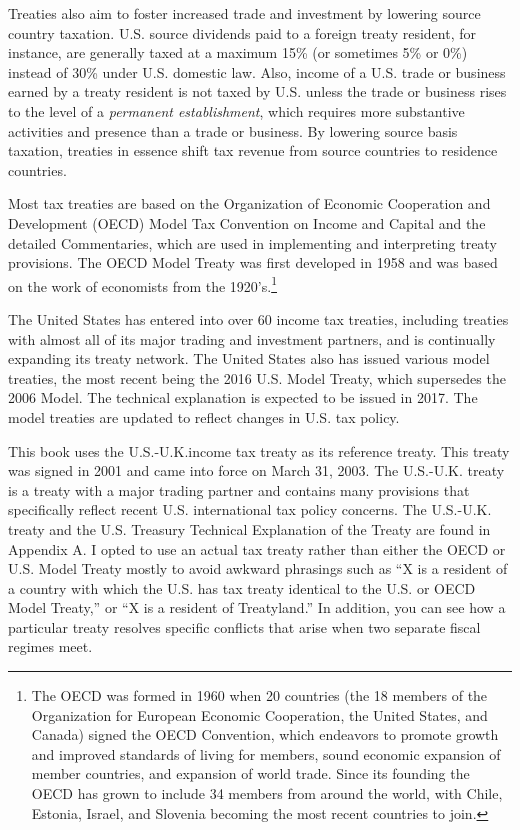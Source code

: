 Treaties also aim to foster increased trade and investment by lowering source country taxation.  U.S. source dividends paid to a foreign treaty resident, for instance, are generally taxed at a maximum 15\% (or sometimes 5\% or 0\%) instead of 30\% under U.S. domestic law.  Also, income of a U.S. trade or business earned by a treaty resident is not taxed by U.S. unless the trade or business rises to the level of a \textit{permanent establishment}, which requires more substantive activities and presence than a trade or business.  By lowering source basis taxation, treaties in essence shift tax revenue from source countries to residence countries.  

Most tax treaties are based on the Organization of Economic Cooperation and Development (OECD) Model Tax Convention on Income and Capital and the detailed Commentaries, which are used in implementing and interpreting treaty provisions.  The OECD Model Treaty was first developed in 1958 and was based on the work of economists from the 1920's.\footnote{ The OECD was  formed in 1960 when 20 countries (the 18 members of the Organization for European Economic Cooperation, the United States, and Canada)  signed the OECD Convention, which endeavors to promote growth and improved standards of living for members, sound economic expansion of member countries, and expansion of world trade.  Since its founding the OECD has grown to include 34 members from around the world, with Chile, Estonia, Israel, and Slovenia becoming the most recent countries to join.}  

The United States has entered into over 60 income tax treaties, including treaties with almost all of its major trading and investment partners, and is continually expanding its treaty network.  The United States also has issued various model treaties, the most recent being the 2016 U.S. Model Treaty, which supersedes the 2006 Model.  The technical explanation is expected to be issued in 2017.  The model treaties are updated to reflect changes in U.S. tax policy.   

This book uses the U.S.-U.K.income tax treaty as its reference treaty. This treaty was signed in 2001 and came into force on March 31, 2003.  The U.S.-U.K. treaty is a treaty with a major trading partner and contains many provisions that specifically reflect recent U.S. international tax policy concerns.  The U.S.-U.K. treaty and the U.S. Treasury Technical Explanation of the Treaty are found in Appendix A.  I opted to use an actual tax treaty rather than either the OECD or U.S. Model Treaty mostly to avoid awkward phrasings such as ``X is a resident of a country with which the U.S. has tax treaty identical to the U.S. or OECD Model Treaty,'' or ``X is a resident of Treatyland.''  In addition, you can see how a particular treaty resolves specific conflicts that arise when two separate fiscal regimes meet.    

